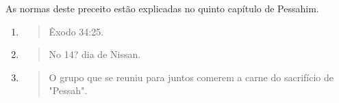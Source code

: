 As normas deste preceito estão explicadas no quinto capítulo de
Pessahim.

\begin{enumerate}
\def\labelenumi{\arabic{enumi}.}
\setcounter{enumi}{285}
\item
  \begin{quote}
  Êxodo 34:25.
  \end{quote}
\item
  \begin{quote}
  No 14? dia de Nissan.
  \end{quote}
\item
  \begin{quote}
  O grupo que se reuniu para juntos comerem a carne do sacrifício de
  "Pessah".
  \end{quote}
\end{enumerate}

